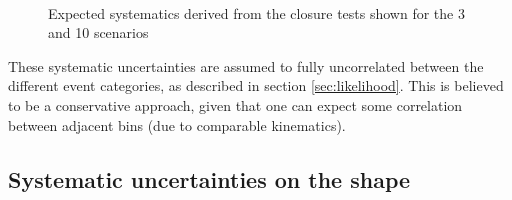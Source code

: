 \begin{figure}[]
  \centering
   ~~
  \caption{\label{fig:systematics} Expected systematics derived from the closure tests shown for
the 3 \ifb and 10 \ifb scenarios}
\end{figure}

These systematic uncertainties are assumed to fully uncorrelated between the different 
event categories, as described in section \ref{sec:likelihood}. 
This is believed to be a conservative approach, given that one can expect some
correlation between adjacent \scalht bins (due to comparable
kinematics).


\subsection{Systematic uncertainties on the \mht shape \label{sec:syst-on-shape}}

